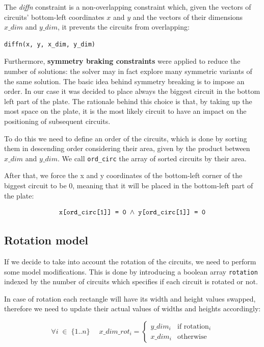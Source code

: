The \textit{diffn} constraint is a non-overlapping constraint which, given the vectors of circuits' bottom-left coordinates $x$ and $y$ and the vectors of their dimensions $x\_dim$ and $y\_dim$, it prevents the circuits from overlapping:

\begin{verbatim}
diffn(x, y, x_dim, y_dim)
\end{verbatim}


Furthermore, \textbf{symmetry braking constraints} were applied to reduce the number of solutions: the solver may in fact explore many symmetric variants of the same solution. The basic idea behind symmetry breaking is to impose an order.
In our case it was decided to place always the biggest circuit in the bottom left part of the plate. The rationale behind this choice is that, by taking up the most space on the plate, it is the most likely circuit to have an impact on the positioning of subsequent circuits.

To do this we need to define an order of the circuits, which is done by sorting them in descending order considering their area, given by the product between $x\_dim$ and $y\_dim$. We call \verb|ord_circ| the array of sorted circuits by their area. 

After that, we force the x and y coordinates of the bottom-left corner of the biggest circuit to be 0, meaning that it will be placed in the bottom-left part of the plate:

\begin{equation*}
    \verb|x[ord_circ[1]] = 0| \; \land \; \verb|y[ord_circ[1]] = 0|
\end{equation*}

\subsection{Rotation model}

If we decide to take into account the rotation of the circuits, we need to perform some model modifications. This is done by introducing a boolean array \verb|rotation| indexed by the number of circuits which specifies if each circuit is rotated or not.

In case of rotation each rectangle will have its width and height values swapped, therefore we need to update their actual values of widths and heights accordingly:

\begin{equation*}
\forall i \; \in \; \{1..n\} \quad \; x\_dim\_rot_i  = \begin{cases} y\_dim_i & \mbox{if } \mbox{rotation$_i$} \\ x\_dim_i & \mbox{otherwise}\end{cases}
\end{equation*}

